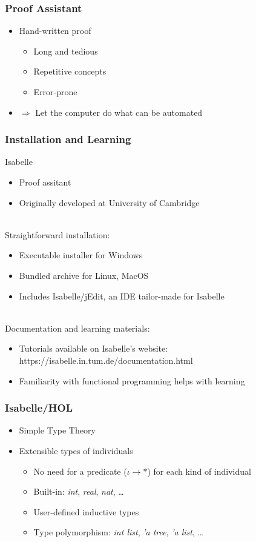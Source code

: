 \documentclass{beamer}
\begin{document}
  \begin{frame}
    \frametitle{Proof Assistant}
    \begin{itemize}
      \item<1-> Hand-written proof
      \begin{itemize}
        \item Long and tedious
        \item Repetitive concepts
        \item Error-prone
      \end{itemize}
      \item<2-> $\Rightarrow$ Let the computer do what can be automated
    \end{itemize}

  \end{frame}

  \begin{frame}
  \frametitle{Installation and Learning}
  Isabelle
  \begin{itemize}
  	\item Proof assitant
  	\item Originally developed at University of Cambridge\\~\
  \end{itemize}
  Straightforward installation:
  \begin{itemize}
  	\item Executable installer for Windows
  	\item Bundled archive for Linux, MacOS
  	\item Includes Isabelle/jEdit, an IDE tailor-made for Isabelle\\~\
  \end{itemize}
  Documentation and learning materials:
  \begin{itemize}
  	\item Tutorials available on Isabelle's website: 
  	https://isabelle.in.tum.de/documentation.html
  	\item Familiarity with functional programming helps with learning
  \end{itemize}
  \end{frame}

  \begin{frame}
    \frametitle{Isabelle/HOL}
    \begin{itemize}
      \item<1-> Simple Type Theory
      \item<2-> Extensible types of individuals
      \begin{itemize}
        \item No need for a predicate ($\iota \rightarrow *$) for each kind of individual
        \item Built-in: \textit{int}, \textit{real}, \textit{nat}, \ldots
        \item User-defined inductive types
        \item Type polymorphism: \textit{int list}, \textit{'a tree}, \textit{'a list}, \ldots
      \end{itemize}
    \end{itemize}
  \end{frame}
\end{document}
